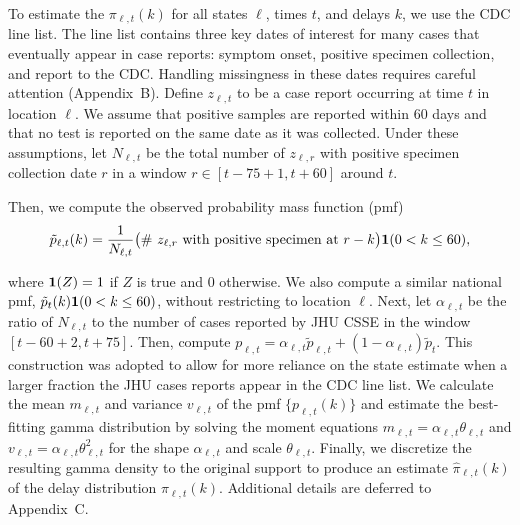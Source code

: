 
\begin{linenomath*} 
To estimate the $\pi_{\ell,t}(k)$ for all states $\ell$, times $t$, and delays
$k$, we use the CDC line list. \citep{cdc2020caserestr} The line list contains
three key dates of interest for many cases that eventually appear in case
reports: symptom onset, positive specimen collection, and report to the CDC.
Handling missingness in these dates requires careful attention
(Appendix~B). Define $z_{\ell,t}$ to be a case report occurring
at time $t$ in location $\ell$. We assume that positive samples
are reported within 60 days and that no test is reported on the same
date as it was collected. Under these assumptions, let $N_{\ell,t}$ be the total
number of $z_{\ell,r}$ with positive specimen collection date $r$ in a window $r
\in [t-75+1, t+60]$ around $t$. 
\end{linenomath*} 
\begin{linenomath*} 
Then, we compute the observed probability mass function (pmf)
\begin{align}
  \tilde{p}_{\ell,t}(k) = \frac{1}{N_{\ell,t}} \big(\textrm{\# $z_{\ell,r}$ with positive specimen at $r-k$}\big)\mathbf{1}(0<k\leq 60),
  \label{eq:line-list-delay}
\end{align}
\end{linenomath*} 
where $\mathbf{1}(Z) = 1$ if $Z$ is true and 0 otherwise. We also compute a
similar national pmf, $\tilde{p}_{t}(k)\mathbf{1}(0<k\leq 60)$, without
restricting to location $\ell$. Next, let $\alpha_{\ell,t}$ be the ratio of
$N_{\ell,t}$ to the number of cases reported by JHU
CSSE\cite{dong2020interactive} in the window $[t-60+2, t+75]$. Then, compute
$p_{\ell,t} = \alpha_{\ell,t}\tilde{p}_{\ell,t} +
(1-\alpha_{\ell,t})\tilde{p}_t$. This construction was adopted to allow for more
reliance on the state estimate when a larger fraction the JHU cases reports
appear in the CDC line list. We calculate the mean $m_{\ell,t}$
and variance $v_{\ell,t}$ of the pmf $\{p_{\ell,t}(k)\}$ and estimate the
best-fitting gamma distribution by solving the moment equations $m_{\ell,t} =
\alpha_{\ell,t}\theta_{\ell,t}$ and $v_{\ell,t}=
\alpha_{\ell,t}\theta_{\ell,t}^2$ for the shape $\alpha_{\ell,t}$ and scale
$\theta_{\ell,t}$. Finally, we discretize the resulting gamma density to the
original support to produce an estimate $\widehat{\pi}_{\ell,t}(k)$ of the delay
distribution $\pi_{\ell,t}(k)$. Additional details are deferred to 
Appendix~C.
 
